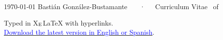 \documentclass[11pt, a4paper]{bgonzalezbustamante-style}
\begin{document}
\makecvheader

\makecvfooter
  {\today}
  {Bastián González-Bustamante ~~~·~~~Curriculum Vitae}
  {\thepage\ of \pageref*{LastPage}}






















\vspace{10mm}
\raggedleft
{\footnotesize Typed in {\small X$_{\textnormal E}${\LaTeX}} with hyperlinks.}\\
{\footnotesize \textcolor{oxfordblue}{\normalsize \faGithub} \href{https://bgonzalezbustamante.github.io/CV-XeLaTeX/}{\textcolor{blue}{Download the latest version in English or Spanish}}.}
\end{document}
